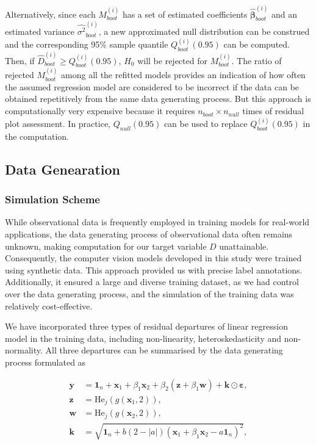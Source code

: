 \documentclass[]{interact}
\theoremstyle{plain}%
\theoremstyle{definition}
\theoremstyle{remark}
\begin{document}
Alternatively, since each \(M_{boot}^{(i)}\) has a set of estimated
coefficients \(\hat{\boldsymbol{\beta}}_{boot}^{(i)}\) and an estimated
variance \(\hat{\sigma^2}_{boot}^{(i)}\), a new approximated null
distribution can be construed and the corresponding 95\% sample quantile
\(Q_{boot}^{(i)}(0.95)\) can be computed. Then, if
\(\hat{D}_{boot}^{(i)} \geq Q_{boot}^{(i)}(0.95)\), \(H_0\) will be
rejected for \(M_{boot}^{(i)}\). The ratio of rejected
\(M_{boot}^{(i)}\) among all the refitted models provides an indication
of how often the assumed regression model are considered to be incorrect
if the data can be obtained repetitively from the same data generating
process. But this approach is computationally very expensive because it
requires \(n_{boot} \times n_{null}\) times of residual plot assessment.
In practice, \(Q_{null}(0.95)\) can be used to replace
\(Q_{boot}^{(i)}(0.95)\) in the computation.

\subsection{Data Genearation}\label{data-genearation}

\subsubsection{Simulation Scheme}\label{simulation-scheme}

While observational data is frequently employed in training models for
real-world applications, the data generating process of observational
data often remains unknown, making computation for our target variable
\(D\) unattainable. Consequently, the computer vision models developed
in this study were trained using synthetic data. This approach provided
us with precise label annotations. Additionally, it ensured a large and
diverse training dataset, as we had control over the data generating
process, and the simulation of the training data was relatively
cost-effective.

We have incorporated three types of residual departures of linear
regression model in the training data, including non-linearity,
heteroskedasticity and non-normality. All three departures can be
summarised by the data generating process formulated as

\begin{align}
\label{eq:data-sim}
\boldsymbol{y} &= \boldsymbol{1}_n + \boldsymbol{x}_1 + \beta_1\boldsymbol{x}_2 + \beta_2(\boldsymbol{z} + \beta_1\boldsymbol{w}) + \boldsymbol{k} \odot \boldsymbol{\varepsilon}, \\
\boldsymbol{z} &= \text{He}_j(g(\boldsymbol{x}_1, 2)), \\
\boldsymbol{w} &= \text{He}_j(g(\boldsymbol{x}_2, 2)), \\
\boldsymbol{k} &= \sqrt{\boldsymbol{1}_n + b(2 - |a|)(\boldsymbol{x}_1 + \beta_1\boldsymbol{x}_2 - a\boldsymbol{1}_n)^2},
\end{align}
\end{document}
